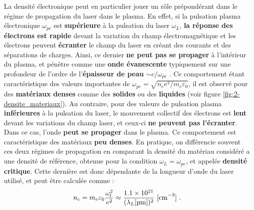 \begin{refsection}
La densité électronique peut en particulier jouer un rôle prépondérant dans le régime de propagation du laser dans le plasma. En effet, si la pulsation plasma électronique $\omega_{pe}$ est \textbf{supérieure} à la pulsation du laser $\omega_L$, \textbf{la réponse des électrons est rapide} devant la variation du champ électromagnétique et les électrons peuvent \textbf{écranter} le champ du laser en créant des courants et des séparations de charges. Ainsi, ce dernier \textbf{ne peut pas se propager} à l'intérieur du plasma, et pénètre comme une \textbf{onde évanescente} typiquement sur une profondeur de l'ordre de l'\textbf{épaisseur de peau} $\sim c/\omega_{pe}$ \parencite{gibbon_2013}. Ce comportement étant caractéristique des valeurs importantes de $\omega_{pe}=\sqrt{n_e e^2/m_e \varepsilon_0}$, il est observé pour des \textbf{matériaux denses} comme des \textbf{solides} ou des \textbf{liquides} (voir figure \ref{fig:2-densite_materiaux}). Au contraire, pour des valeurs de pulsation plasma \textbf{inférieures} à la pulsation du laser, le mouvement collectif des électrons est \textbf{lent} devant les variations du champ laser, et ceux-ci \textbf{ne peuvent pas l'écranter}. Dans ce cas, l'onde \textbf{peut se propager} dans le plasma. Ce comportement est caractéristique des matériaux \textbf{peu denses}. En pratique, on différencie souvent ces deux régimes de propagation en comparant la densité du matériau considéré a une densité de référence, obtenue pour la condition $\omega_L=\omega_{pe}$, et appelée \textbf{densité critique}. Cette dernière est donc dépendante de la longueur d'onde du laser utilisé, et peut être calculée comme :
\begin{equation}
    n_c = m_e \varepsilon_0 \dfrac{\omega_l^2}{e^2} \approx \dfrac{1.1 \times 10^{21}}{(\lambda_L \si{[\um]})^2} ~ \si{[\cm^{-3}]} ~ \rm .
    \label{eq:2-densite_critique}
\end{equation}


\end{refsection}
